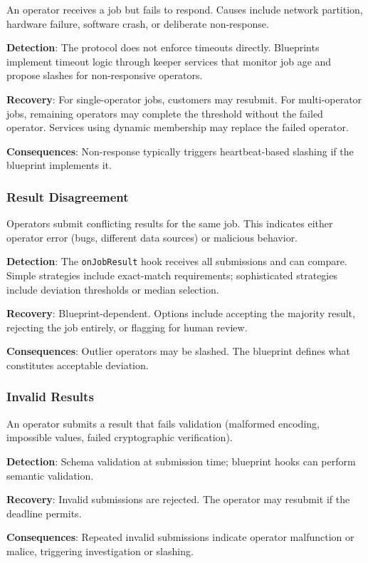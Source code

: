 \documentclass[11pt,a4paper]{article}
\begin{document}
An operator receives a job but fails to respond. Causes include network partition, hardware failure, software crash, or deliberate non-response.

\textbf{Detection}: The protocol does not enforce timeouts directly. Blueprints implement timeout logic through keeper services that monitor job age and propose slashes for non-responsive operators.

\textbf{Recovery}: For single-operator jobs, customers may resubmit. For multi-operator jobs, remaining operators may complete the threshold without the failed operator. Services using dynamic membership may replace the failed operator.

\textbf{Consequences}: Non-response typically triggers heartbeat-based slashing if the blueprint implements it.

\subsubsection{Result Disagreement}

Operators submit conflicting results for the same job. This indicates either operator error (bugs, different data sources) or malicious behavior.

\textbf{Detection}: The \texttt{onJobResult} hook receives all submissions and can compare. Simple strategies include exact-match requirements; sophisticated strategies include deviation thresholds or median selection.

\textbf{Recovery}: Blueprint-dependent. Options include accepting the majority result, rejecting the job entirely, or flagging for human review.

\textbf{Consequences}: Outlier operators may be slashed. The blueprint defines what constitutes acceptable deviation.

\subsubsection{Invalid Results}

An operator submits a result that fails validation (malformed encoding, impossible values, failed cryptographic verification).

\textbf{Detection}: Schema validation at submission time; blueprint hooks can perform semantic validation.

\textbf{Recovery}: Invalid submissions are rejected. The operator may resubmit if the deadline permits.

\textbf{Consequences}: Repeated invalid submissions indicate operator malfunction or malice, triggering investigation or slashing.
\end{document}
